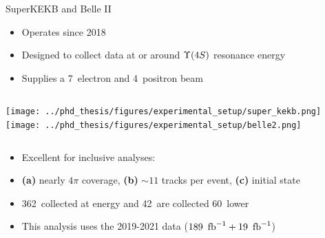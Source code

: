 \documentclass[xcolor=dvipsnames]{beamer}
\begin{document}
   \begin{frame}{SuperKEKB and Belle II}
      \scriptsize\centering

      \begin{itemize}
         \item Operates since 2018
         \item Designed to collect data at or around $\FourS$ resonance energy
         \item Supplies a 7~\gev electron and 4~\gev positron beam
      \end{itemize}

      \begin{columns}
         \texttt{[image: ../phd\_thesis/figures/experimental\_setup/super\_kekb.png]}
          \texttt{[image: ../phd\_thesis/figures/experimental\_setup/belle2.png]}
      \end{columns}

      \vspace{10pt}

      \begin{itemize}
         \item Excellent for inclusive analyses: 
         \item[] \textbf{(a)} nearly $4\pi$ coverage, \textbf{(b)} $\sim 11$ tracks per \FourS event, \textbf{(c)} \epem initial state
         \item 362~\invfb collected at \FourS energy and 42~\invfb are collected 60~\mev lower
         \item This analysis uses the 2019-2021 data ($189~\mbox{\,fb}^{-1}+19~\mbox{\,fb}^{-1}$)
      \end{itemize}
   \end{frame}
\end{document}
